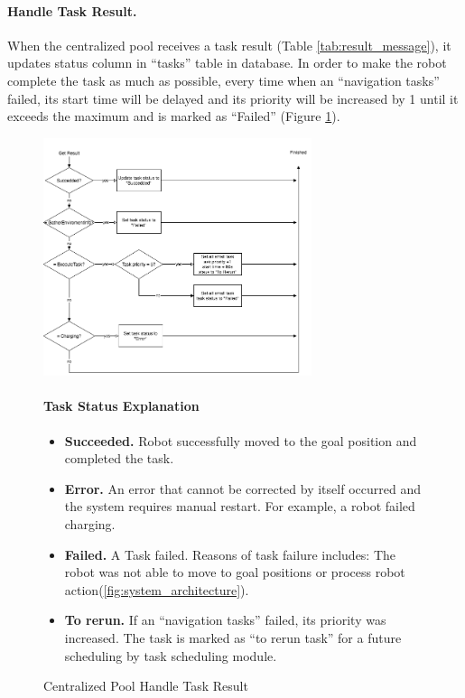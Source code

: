 \paragraph{Handle Task Result.}
When the centralized pool receives a task result (Table \ref{tab:result_message}), it updates status column in ``tasks'' table in database. 
In order to make the robot complete the task as much as possible, every time when an ``navigation tasks'' failed, its start time will be delayed and its priority will be increased by 1 until it exceeds the maximum and is marked as ``Failed'' 
(Figure \ref{fig:centralized_task_handle}).


\begin{figure}[htbp]
    \centering
    \includegraphics[width = 0.7\textwidth]{content/images/ch4/centralized_task_result.drawio.png}
    \caption{Centralized Pool Handle Task Result}
    \label{fig:centralized_task_handle}
    \paragraph{Task Status Explanation}
    \begin{itemize}     
        \item \textbf{Succeeded.} Robot successfully moved to the goal position and completed the task.
        \item \textbf{Error.} An error that cannot be corrected by itself occurred and the system requires manual restart. For example, a robot failed charging.
        \item \textbf{Failed.} A Task failed. Reasons of task failure includes: The robot was not able to move to goal positions or process robot action(\ref{fig:system_architecture}). 
        \item \textbf{To rerun.} If an ``navigation tasks'' failed, its priority was increased. The task is marked as ``to rerun task''  for a future scheduling by task scheduling module.
    \end{itemize}   
\end{figure}


